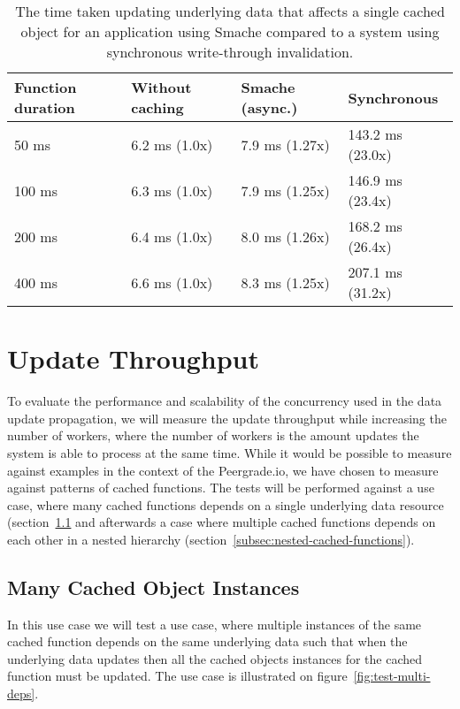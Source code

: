 \begin{table}[ht!]
  \centering
  \begin{tabular}{llll}
    \hline
    Function duration & Without caching & Smache (async.) & Synchronous \\
    \hline
    50 ms  & 6.2 ms (1.0x)  & 7.9 ms (1.27x)  &  143.2 ms (23.0x) \\
    100 ms & 6.3 ms (1.0x)  & 7.9 ms (1.25x)  &  146.9 ms (23.4x) \\
    200 ms & 6.4 ms (1.0x)  & 8.0 ms (1.26x)  &  168.2 ms (26.4x) \\
    400 ms & 6.6 ms (1.0x)  & 8.3 ms (1.25x)  &  207.1 ms (31.2x) \\
    \hline
  \end{tabular}
  \caption{The time taken updating underlying data that affects a single cached object for an application using Smache compared to a system using synchronous write-through invalidation.}
  \label{tab:update-requests}
\end{table}


\section{Update Throughput}
\label{sec:update-throughput}

To evaluate the performance and scalability of the concurrency used in the data update propagation, we will measure the update throughput while increasing the number of workers, where the number of workers is the amount updates the system is able to process at the same time. While it would be possible to measure against examples in the context of the Peergrade.io, we have chosen to measure against patterns of cached functions. The tests will be performed against a use case, where many cached functions depends on a single underlying data resource (section~\ref{subsec:many-cached-object-instances} and afterwards a case where multiple cached functions depends on each other in a nested hierarchy (section~\ref{subsec:nested-cached-functions}).

\subsection{Many Cached Object Instances}
\label{subsec:many-cached-object-instances}

In this use case we will test a use case, where multiple instances of the same cached function depends on the same underlying data such that when the underlying data updates then all the cached objects instances for the cached function must be updated. The use case is illustrated on figure~\ref{fig:test-multi-deps}.

